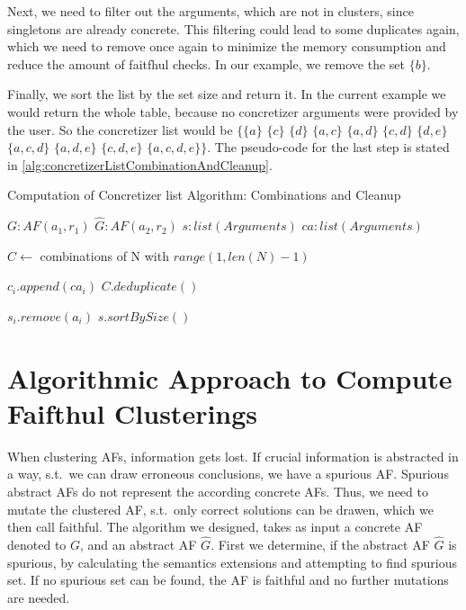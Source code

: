 Next, we need to filter out the arguments, which are not in clusters, since singletons are already concrete. This filtering could lead to some duplicates again, which we need to remove once again to minimize the memory consumption and reduce the amount of faitfhul checks. In our example, we remove the set $\{b\}$.

Finally, we sort the list by the set size and return it. In the current example we would return the whole table, because no concretizer arguments were provided by the user. So the concretizer list would be
$\bigl\{\{a\}$
$\{c\}$
$\{d\}$
$\{a, c\}$
$\{a, d\}$
$\{c, d\}$
$\{d, e\}$
$\{a, c, d\}$
$\{a, d, e\}$
$\{c, d, e\}$
$\{a, c, d, e\}\bigl\}$. The pseudo-code for the last step is stated in \cref{alg:concretizerListCombinationAndCleanup}.


\begin{algorithm}
    \caption{Computation of Concretizer list Algorithm: Combinations and Cleanup}\label{alg:concretizerListCombinationAndCleanup}
    \begin{algorithmic}[1]
        \Require $G: AF(a_1, r_1)$ 
        \Require $\hat{G}: AF(a_2, r_2)$ 
        \Require $s: list(Arguments)$ 
        \Require $ca: list(Arguments)$ 

        \State $C \gets$ combinations of N with $range(1, len(N)-1)$ 

         
                \State $c_i.append(ca_i)$
            \EndFor
        \EndFor
        \State $C.deduplicate()$

         
                    \State $s_i.remove(a_i)$
                \EndIf
            \EndFor
        \EndFor
        \State \Return $s.sortBySize()$
    \end{algorithmic}
\end{algorithm}

\newpage

\section{Algorithmic Approach to Compute Faifthul Clusterings}
\label{sec:AlgorithmicApproachToComputeFaifthulClusterings}
When clustering AFs, information gets lost. If crucial information is abstracted in a way, s.t.\ we can draw erroneous conclusions, we have a spurious AF. Spurious abstract AFs do not represent the according concrete AFs. Thus, we need to mutate the clustered AF, s.t.\ only correct solutions can be drawen, which we then call faithful. The algorithm we designed, takes as input a concrete AF denoted to $G$, and an abstract AF $\hat{G}$. First we determine, if the abstract AF $\hat{G}$ is spurious, by calculating the semantics extensions and attempting to find spurious set. If no spurious set can be found, the AF is faithful and no further mutations are needed.


